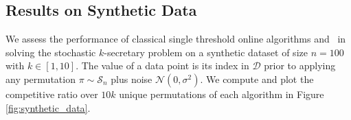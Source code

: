 


\subsection{Results on Synthetic Data}
\label{results_on_synthetic_data}
We assess the performance of classical single threshold online algorithms and \algoname\ in solving the stochastic $k$-secretary problem on a synthetic dataset of size $n=100$ with $k \in [1,10]$. The value of a data point is its index in $\mathcal{D}$ prior to applying any permutation $\pi \sim \mathcal{S}_n$ plus noise $\mathcal{N}(0, \sigma^2)$. We compute and plot the competitive ratio over $10k$ unique permutations of each algorithm in Figure \ref{fig:synthetic_data}. 

